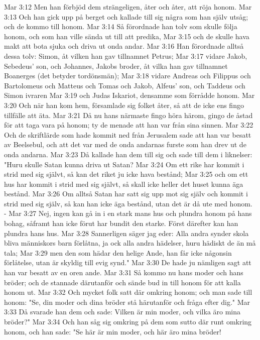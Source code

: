 Mar 3:12  Men han förbjöd dem strängeligen, åter och åter, att röja honom.
Mar 3:13  Och han gick upp på berget och kallade till sig några som han själv utsåg; och de kommo till honom.
Mar 3:14  Så förordnade han tolv som skulle följa honom, och som han ville sända ut till att predika,
Mar 3:15  och de skulle hava makt att bota sjuka och driva ut onda andar.
Mar 3:16  Han förordnade alltså dessa tolv: Simon, åt vilken han gav tillnamnet Petrus;
Mar 3:17  vidare Jakob, Sebedeus' son, och Johannes, Jakobs broder, åt vilka han gav tillnamnet Boanerges (det betyder tordönsmän);
Mar 3:18  vidare Andreas och Filippus och Bartolomeus och Matteus och Tomas och Jakob, Alfeus' son, och Taddeus och Simon ivraren
Mar 3:19  och Judas Iskariot, densamme som förrådde honom.
Mar 3:20  Och när han kom hem, församlade sig folket åter, så att de icke ens fingo tillfälle att äta.
Mar 3:21  Då nu hans närmaste fingo höra härom, gingo de åstad för att taga vara på honom; ty de menade att han var från sina sinnen.
Mar 3:22  Och de skriftlärde som hade kommit ned från Jerusalem sade att han var besatt av Beelsebul, och att det var med de onda andarnas furste som han drev ut de onda andarna.
Mar 3:23  Då kallade han dem till sig och sade till dem i liknelser: "Huru skulle Satan kunna driva ut Satan?
Mar 3:24  Om ett rike har kommit i strid med sig självt, så kan det riket ju icke hava bestånd;
Mar 3:25  och om ett hus har kommit i strid med sig självt, så skall icke heller det huset kunna äga bestånd.
Mar 3:26  Om alltså Satan har satt sig upp mot sig själv och kommit i strid med sig själv, så kan han icke äga bestånd, utan det är då ute med honom. -
Mar 3:27  Nej, ingen kan gå in i en stark mans hus och plundra honom på hans bohag, såframt han icke förut har bundit den starke. Först därefter kan han plundra hans hus.
Mar 3:28  Sannerligen säger jag eder: Alla andra synder skola bliva människors barn förlåtna, ja ock alla andra hädelser, huru hädiskt de än må tala;
Mar 3:29  men den som hädar den helige Ande, han får icke någonsin förlåtelse, utan är skyldig till evig synd."
Mar 3:30  De hade ju nämligen sagt att han var besatt av en oren ande.
Mar 3:31  Så kommo nu hans moder och hans bröder; och de stannade därutanför och sände bud in till honom för att kalla honom ut.
Mar 3:32  Och mycket folk satt där omkring honom; och man sade till honom: "Se, din moder och dina bröder stå härutanför och fråga efter dig."
Mar 3:33  Då svarade han dem och sade: Vilken är min moder, och vilka äro mina bröder?"
Mar 3:34  Och han såg sig omkring på dem som sutto där runt omkring honom, och han sade: "Se här är min moder, och här äro mina bröder!
